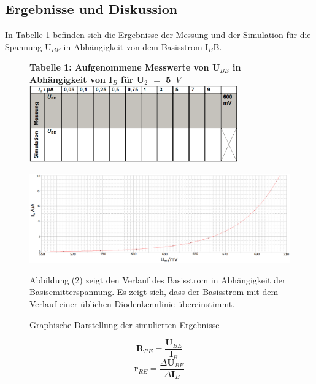 \subsection{Ergebnisse und Diskussion}
In Tabelle 1 befinden sich die Ergebnisse der Messung und der Simulation f\"ur die Spannung U$_{BE}$ in Abh\"angigkeit von dem Basisstrom I$_B$B.
\begin{figure}[!h]
\begin{center}
\textbf{Tabelle 1: Aufgenommene Messwerte von U$_{BE}$ in Abh\"angigkeit von I$_B$ f\"ur U$_2$ $=$ 5~$V$ } \\[0.2cm]
\includegraphics[width=0.8\textwidth]{ergebnissVersuch1}
\end{center}
\end{figure}
\begin{figure}[!h]
\begin{center}
\vspace{10cm}
\includegraphics[width=1\textwidth]{Verscuh1}
\caption{Graphische Darstellung der simulierten Ergebnisse}
\end{center}
Abbildung (2) zeigt den Verlauf des Basisstrom in Abh\"angigkeit der Basisemitterspannung. Es zeigt sich, dass der Basisstrom mit dem Verlauf einer \"ublichen Diodenkennlinie \"ubereinstimmt. 
\end{figure}
\begin{equation}
\textbf{R$_{RE}$} = \frac{\textbf{U$_{BE}$}}{\textbf{I$_B$}}
\end{equation}
\begin{equation}
\textbf{r$_{RE}$} = \frac{\textbf{$\Delta$U$_{BE}$}}{\textbf{$\Delta$I$_B$}}
\end{equation}
